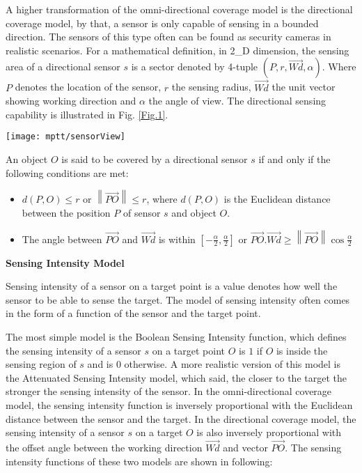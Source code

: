\documentclass[final]{elsarticle}
\begin{document}
A higher transformation of the omni-directional coverage model is the directional coverage model, by that, a sensor is only capable of sensing in a bounded direction. The sensors of this type often can be found as security cameras in realistic scenarios. For a mathematical definition, in 2\_D dimension, the sensing area of a directional sensor $ s $ is a sector denoted by 4-tuple $( P, r, \overrightarrow{Wd}, \alpha )$. Where $ P $ denotes the location of the sensor, $ r $ the sensing radius, $ \overrightarrow{Wd}$ the unit vector showing working direction and $ \alpha $ the angle of view. The directional sensing capability is illustrated in Fig. \ref{Fig.1}. \\
\begin{figure*}[h]
	\centering
	\texttt{[image: mptt/sensorView]}
	\caption{Sensing capability of directional sensor}
	\label{Fig.1}       %
\end{figure*}
An object $ O $ is said to be covered by a directional sensor $ s $ if and only if the following conditions are met: 
\begin{itemize}
	\itemsep0em
	\item $d(P,O) \le r$ or $\left\| {\overrightarrow {PO} } \right\| \le r$, where $d(P,O)$ is the Euclidean distance between the position $ P $ of sensor $s$ and object $ O $.
	\item The angle between $\overrightarrow{PO}$ and $\overrightarrow {Wd} $ is within $\left[ { - \frac{\alpha}{2} ,\frac{\alpha}{2} } \right]$ or $\overrightarrow {PO} .\overrightarrow {Wd}  \ge \left\| {\overrightarrow {PO} } \right\|\cos \frac{\alpha}{2} $	
\end{itemize}

\textbf{Sensing Intensity Model}

Sensing intensity of a sensor on a target point is a value denotes how well the sensor to be able to sense the target. The model of sensing intensity often comes in the form of a function of the sensor and the target point. 

The most simple model is the Boolean Sensing Intensity function, which defines the sensing intensity of a sensor $ s $ on a target point $ O $ is $1$ if $O$ is inside the sensing region of $s$ and is $0$ otherwise. A more realistic version of this model is the Attenuated Sensing Intensity model, which said, the closer to the target the stronger the sensing intensity of the sensor. In the omni-directional coverage model, the sensing intensity function is inversely proportional with the Euclidean distance between the sensor and the target. In the directional coverage model, the sensing intensity of a sensor $s$ on a target $O$ is also inversely proportional with the offset angle between the working direction $\overrightarrow{Wd}$ and vector $\overrightarrow{PO}$. The sensing intensity functions of these two models are shown in following:
\end{document}
